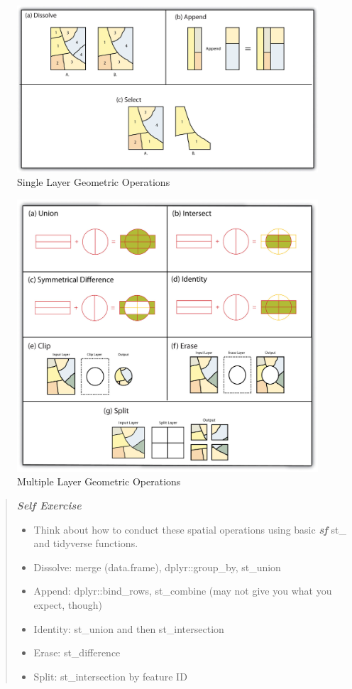 \documentclass[
  11pt,
]{book}
\providecommand{\tightlist}{%
  \setlength{\itemsep}{0pt}\setlength{\parskip}{0pt}}
\begin{document}
\begin{figure}
\includegraphics[width=1\linewidth]{img/single_layer_operation} \caption{Single Layer Geometric Operations}\label{fig:single-layer-ops}
\end{figure}

\begin{figure}
\includegraphics[width=1\linewidth]{img/multi-layer-overlay} \caption{Multiple Layer Geometric Operations}\label{fig:multi-layer-ops}
\end{figure}

\begin{quote}
\textbf{\emph{Self Exercise}}

\begin{itemize}
\tightlist
\item
  Think about how to conduct these spatial operations using basic \textbf{\emph{sf}} st\_ and tidyverse functions.
\item
  Dissolve: merge (data.frame), dplyr::group\_by, st\_union
\item
  Append: dplyr::bind\_rows, st\_combine (may not give you what you expect, though)
\item
  Identity: st\_union and then st\_intersection
\item
  Erase: st\_difference
\item
  Split: st\_intersection by feature ID
\end{itemize}
\end{quote}
\end{document}
